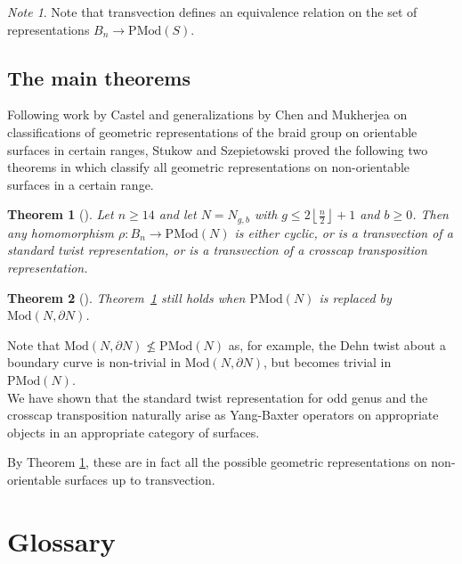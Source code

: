 \documentclass[reqno]{amsart}
\newtheorem{theorem}{Theorem}[section]
\theoremstyle{definition}
\theoremstyle{remark}
\newtheorem*{note}{Note}
\newcommand{\Mod}{{\mathrm{Mod}}}
\newcommand{\PMod}{{\mathrm{PMod}}}
\begin{document}
\begin{note}
    Note that transvection defines an
    equivalence relation on
    the set of representations
    $B_n \to \PMod(S)$.
\end{note}


\subsection{The main theorems}

Following work by Castel and generalizations by
Chen and Mukherjea on classifications
of geometric representations of the braid
group on orientable surfaces in certain ranges,
Stukow and Szepietowski
proved the following two theorems in \cite{StSz} which classify
all geometric representations on non-orientable surfaces
in a certain range. 

\begin{theorem}[]\label{Thm1.2}
    Let $n \ge 14$ and let $N = N_{g,b}$ with
    $g \le 2 \left\lfloor \frac{n}{2} \right\rfloor +1$ and
    $b\ge 0$. Then any homomorphism
    $\rho \colon B_n \to \PMod (N)$ is either
    cyclic, or is a transvection of a standard twist
    representation, or is a transvection of a crosscap
    transposition representation.
\end{theorem}

\begin{theorem}[]\label{Thm1.3}
    Theorem~\ref{Thm1.2} still holds
    when $\PMod (N)$ is replaced by $\Mod \left( N,
    \partial N \right) $.
\end{theorem}

Note that $\Mod (N, \partial N) \not \le 
\PMod (N)$ as, for example, the Dehn twist about a boundary
curve is non-trivial in $\Mod \left( N, \partial N \right) $, but
becomes trivial in $\PMod (N)$.\\
\linebreak
We have shown that
the standard twist representation for odd genus and the
crosscap transposition naturally arise as
Yang-Baxter operators on appropriate objects in
an appropriate category of surfaces.

By Theorem \ref{Thm1.2}, these are in fact all the possible
geometric representations on non-orientable surfaces
up to transvection. \todo{}


\newpage

\section{Glossary}
\end{document}
